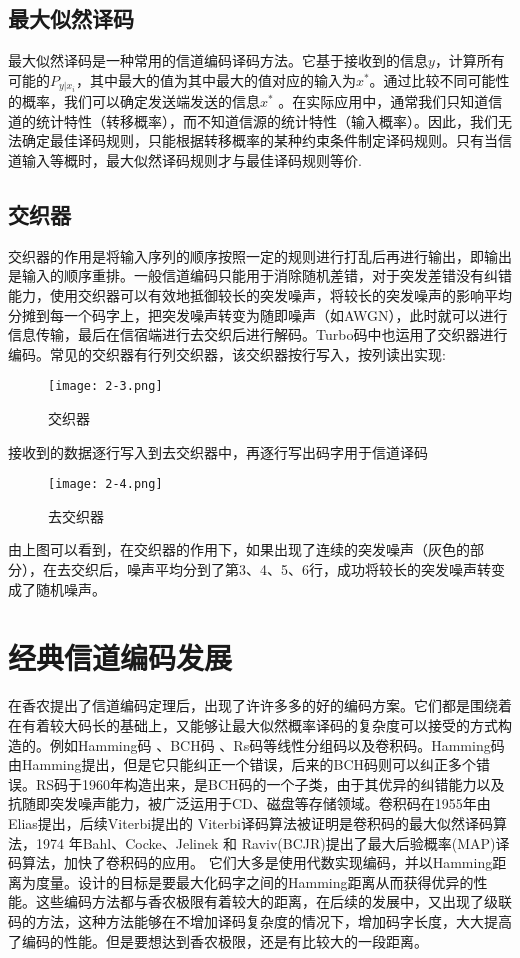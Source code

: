 \documentclass{article}
\begin{document}
\subsection{最大似然译码}
最大似然译码是一种常用的信道编码译码方法。它基于接收到的信息$y$，计算所有可能的$P_{y|x_i}$，其中最大的值为其中最大的值对应的输入为$x^*$。通过比较不同可能性的概率，我们可以确定发送端发送的信息$x^*$ 。在实际应用中，通常我们只知道信道的统计特性（转移概率），而不知道信源的统计特性（输入概率）。因此，我们无法确定最佳译码规则，只能根据转移概率的某种约束条件制定译码规则。只有当信道输入等概时，最大似然译码规则才与最佳译码规则等价.

\subsection{交织器}
交织器的作用是将输入序列的顺序按照一定的规则进行打乱后再进行输出，即输出是输入的顺序重排。一般信道编码只能用于消除随机差错，对于突发差错没有纠错能力，使用交织器可以有效地抵御较长的突发噪声，将较长的突发噪声的影响平均分摊到每一个码字上，把突发噪声转变为随即噪声（如AWGN），此时就可以进行信息传输，最后在信宿端进行去交织后进行解码。Turbo码中也运用了交织器进行编码。常见的交织器有行列交织器，该交织器按行写入，按列读出实现:

\begin{figure}[h]
  \centering
  \texttt{[image: 2-3.png]}
  \caption{交织器}
\end{figure}

接收到的数据逐行写入到去交织器中，再逐行写出码字用于信道译码

\begin{figure}[h]
  \centering
  \texttt{[image: 2-4.png]}
  \caption{去交织器}
\end{figure}

由上图可以看到，在交织器的作用下，如果出现了连续的突发噪声（灰色的部分），在去交织后，噪声平均分到了第3、4、5、6行，成功将较长的突发噪声转变成了随机噪声。

\section{经典信道编码发展}
在香农提出了信道编码定理后，出现了许许多多的好的编码方案。它们都是围绕着在有着较大码长的基础上，又能够让最大似然概率译码的复杂度可以接受的方式构造的。例如Hamming码 、BCH码 、Rs码等线性分组码以及卷积码。Hamming码由Hamming提出，但是它只能纠正一个错误，后来的BCH码则可以纠正多个错误。RS码于1960年构造出来，是BCH码的一个子类，由于其优异的纠错能力以及抗随即突发噪声能力，被广泛运用于CD、磁盘等存储领域。卷积码在1955年由Elias提出，后续Viterbi提出的 Viterbi译码算法被证明是卷积码的最大似然译码算法，1974 年Bahl、Cocke、Jelinek 和 Raviv(BCJR)提出了最大后验概率(MAP)译码算法，加快了卷积码的应用。
它们大多是使用代数实现编码，并以Hamming距离为度量。设计的目标是要最大化码字之间的Hamming距离从而获得优异的性能。这些编码方法都与香农极限有着较大的距离，在后续的发展中，又出现了级联码的方法，这种方法能够在不增加译码复杂度的情况下，增加码字长度，大大提高了编码的性能。但是要想达到香农极限，还是有比较大的一段距离。
\end{document}
